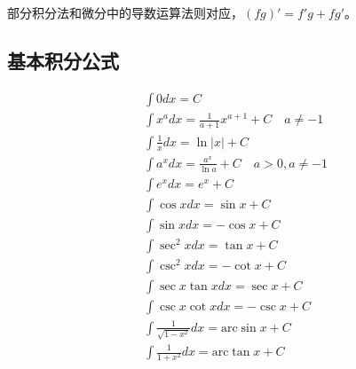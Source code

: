 \begin{tcolorbox}
部分积分法和微分中的导数运算法则对应，$\left( fg \right) '=f'g+fg'$。
\end{tcolorbox}

\subsection{基本积分公式}

\begin{align*}
&\int{0dx}=C \\
&\int{x^adx}=\frac{1}{a+1}x^{a+1}+C \quad a\ne -1 \\
&\int{\frac{1}{x}dx}=\ln \left| x \right|+C \\
&\int{a^xdx}=\frac{a^x}{\ln a}+C \quad a>0,a\ne -1 \\
&\int{e^xdx}=e^x+C \\
&\int{\cos xdx}=\sin x+C \\
&\int{\sin xdx}=-\cos x+C \\
&\int{\sec ^2xdx}=\tan x+C \\
&\int{\csc ^2xdx}=-\cot x+C \\
&\int{\sec x\tan xdx}=\sec x+C \\
&\int{\csc x\cot xdx}=-\csc x+C \\
&\int{\frac{1}{\sqrt{1-x^2}}dx}=\mathrm{arc}\sin x+C \\
&\int{\frac{1}{1+x^2}dx}=\mathrm{arc}\tan x+C
\end{align*}




